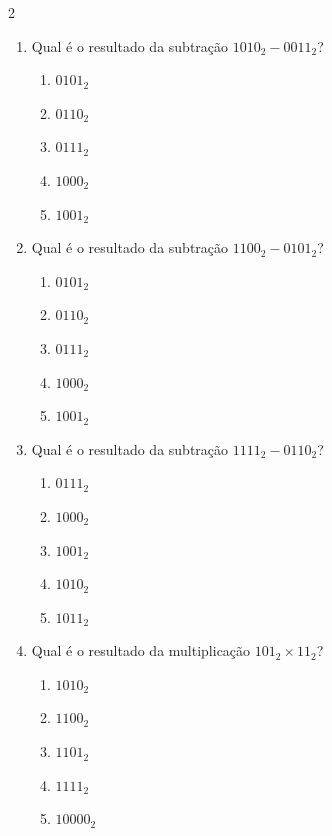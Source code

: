 \documentclass[a4paper,12pt]{article}
\begin{document}
\begin{multicols}{2}
\begin{enumerate}[leftmargin=*]
\item Qual é o resultado da subtração
$1010_2 - 0011_2$?

\begin{enumerate}[label=(\Alph*)]
    \item $0101_2$
    \item $0110_2$
    \item $0111_2$
    \item $1000_2$
    \item $1001_2$
\end{enumerate}

\vspace{0.2cm}


\item Qual é o resultado da subtração
$1100_2 - 0101_2$?

\begin{enumerate}[label=(\Alph*)]
    \item $0101_2$
    \item $0110_2$
    \item $0111_2$
    \item $1000_2$
    \item $1001_2$
\end{enumerate}

\vspace{0.2cm}


\item Qual é o resultado da subtração
$1111_2 - 0110_2$?

\begin{enumerate}[label=(\Alph*)]
    \item $0111_2$
    \item $1000_2$
    \item $1001_2$
    \item $1010_2$
    \item $1011_2$
\end{enumerate}

\vspace{0.2cm}



\item Qual é o resultado da multiplicação
$101_2 \times 11_2$?

\begin{enumerate}[label=(\Alph*)]
    \item $1010_2$
    \item $1100_2$
    \item $1101_2$
    \item $1111_2$
    \item $10000_2$
\end{enumerate}


\end{enumerate}
\end{multicols}
\end{document}

